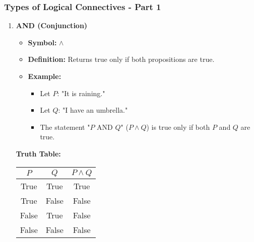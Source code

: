 \documentclass[aspectratio=169]{beamer}
\begin{document}
\begin{frame}[fragile]
    \frametitle{Types of Logical Connectives - Part 1}
    \begin{enumerate}
        \item \textbf{AND (Conjunction)} 
            \begin{itemize}
                \item \textbf{Symbol:} $\wedge$
                \item \textbf{Definition:} Returns true only if both propositions are true.
                \item \textbf{Example:}
                \begin{itemize}
                    \item Let $P$: "It is raining."
                    \item Let $Q$: "I have an umbrella."
                    \item The statement "$P$ AND $Q$" ($P \wedge Q$) is true only if both $P$ and $Q$ are true.
                \end{itemize}
            \end{itemize}
            \textbf{Truth Table:}
            \begin{tabular}{|c|c|c|}
                \hline
                $P$ & $Q$ & $P \wedge Q$ \\
                \hline
                True & True  & True  \\
                True & False & False \\
                False & True  & False \\
                False & False & False \\
                \hline
            \end{tabular}
    \end{enumerate}
\end{frame}
\end{document}
